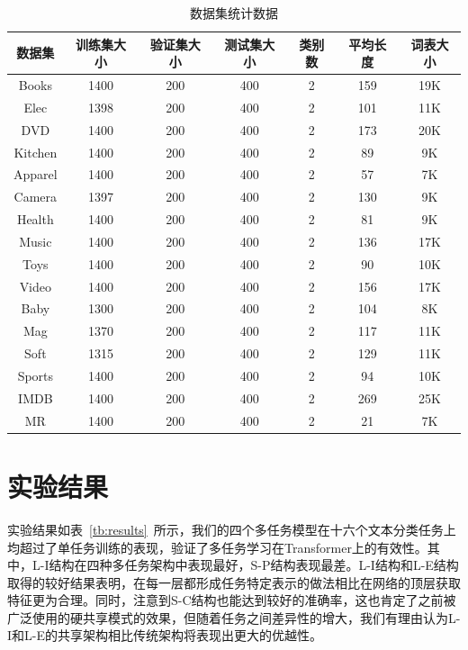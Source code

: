 \begin{table}[htb]
	\centering
	\caption{数据集统计数据}
	\begin{tabular}{ccccccc}
		\toprule[2pt]
		数据集&训练集大小&验证集大小&测试集大小&类别数&平均长度&词表大小\\
		\midrule[1pt]
		Books& 1400& 200& 400& 2& 159& 19K\\
		Elec& 1398& 200& 400& 2& 101& 11K\\
		DVD& 1400& 200& 400& 2& 173& 20K\\
		Kitchen& 1400& 200& 400& 2& 89& 9K\\
		Apparel& 1400& 200& 400& 2& 57& 7K\\
		Camera& 1397& 200& 400& 2& 130& 9K\\
		Health& 1400& 200& 400& 2& 81& 9K\\
		Music& 1400& 200& 400& 2& 136& 17K\\
		Toys& 1400& 200& 400& 2& 90& 10K\\
		Video& 1400& 200& 400& 2& 156& 17K\\
		Baby& 1300& 200& 400& 2& 104& 8K\\
		Mag& 1370& 200& 400& 2& 117& 11K\\
		Soft& 1315& 200& 400& 2& 129& 11K\\
		Sports& 1400& 200& 400& 2& 94& 10K\\
		IMDB& 1400& 200& 400& 2& 269& 25K\\
		MR& 1400& 200& 400& 2& 21& 7K\\
		\bottomrule[2pt]
	\end{tabular}
	\label{tb:dataset}
\end{table}

\section{实验结果}
\label{sec:results}
实验结果如表~\ref{tb:results}~所示，我们的四个多任务模型在十六个文本分类任务上均超过了单任务训练的表现，验证了多任务学习在Transformer上的有效性。其中，L-I结构在四种多任务架构中表现最好，S-P结构表现最差。L-I结构和L-E结构取得的较好结果表明，在每一层都形成任务特定表示的做法相比在网络的顶层获取特征更为合理。同时，注意到S-C结构也能达到较好的准确率，这也肯定了之前被广泛使用的硬共享模式的效果，但随着任务之间差异性的增大，我们有理由认为L-I和L-E的共享架构相比传统架构将表现出更大的优越性。

